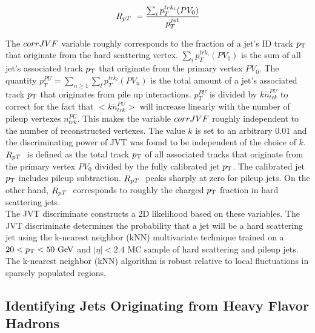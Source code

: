 \begin{equation}
R_{pT}\  = \frac{\sum_i p_T^{trk_i} (PV_0) }{ p_T^{jet} }
\label{eqn:RpT}
\end{equation}

\indent The $corrJVF$ variable roughly corresponds to the fraction of a jet's ID track $p_{\mathrm{T}}$ that originate from the hard scattering vertex.  $\sum_i p_T^{trk_i} (PV_0)$ is the sum of all jet's associated track $p_{\mathrm{T}}$ that originate from the primary vertex $PV_0$.  The quantity $p^{PU}_T = \sum_{n\ge1} \sum_l p_T^{trk_l} (PV_n)$ is the total amount of a jet's associated track $p_{\mathrm{T}}$ that originates from pile up interactions.  $p^{PU}_T$ is divided by $k\dot n^{PU}_{trk}$ to correct for the fact that $<k\dot n^{PU}_{trk}>$ will increase linearly with the number of pileup vertexes $n^{PU}_{trk}$.  This makes the variable $corrJVF$ roughly independent to the number of reconstructed vertexes. The value $k$ is set to an arbitrary $0.01$ and the discriminating power of JVT was found to be independent of the choice of $k$.\\

\indent $R_{pT}\ $ is defined as the total track $p_{\mathrm{T}}$ of all associated tracks that originate from the primary vertex $PV_0$ divided by the fully calibrated jet $p_{\mathrm{T}}$. The calibrated jet $p_{\mathrm{T}}$ includes pileup subtraction.  $R_{pT}\ $ peaks sharply at zero for pileup jets.  On the other hand, $R_{pT}\ $ corresponds to roughly the charged $p_{\mathrm{T}}$ fraction in hard scattering jets.  \\

\indent The JVT discriminate constructs a 2D likelihood based on these variables.   The JVT discriminate determines the probability that a jet will be a hard scattering jet using the k-nearest neighbor (kNN) multivariate technique \cite{TMVA} trained on a $20<\pt<50 \gev$ and $|\eta|<2.4$ MC sample of hard scattering and pileup jets.  The k-nearest neighbor (kNN) algorithm is robust relative to local fluctuations in sparsely populated regions.  \\

\subsection{Identifying Jets Originating from Heavy Flavor Hadrons}
\label{sec:jet:btagging}

